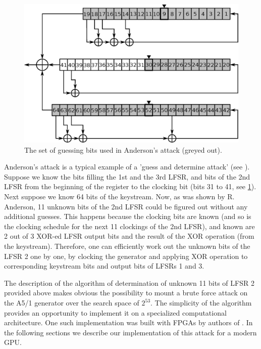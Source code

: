 \documentclass[runningheads,a4paper]{llncs}[2015/06/24]
\begin{document}
\begin{figure}
	\includegraphics[width=\linewidth]{./a51and.eps} 
	\caption{The set of guessing bits used in Anderson's attack (greyed out).}
	\label{fig:a51and}
\end{figure}


Anderson's attack is a typical example of a 'guess and determine attack' (see
\cite{BARD}). Suppose we know the bits filling the 1st and the 3rd LFSR, and
bits of the 2nd LFSR from the beginning of the register to the clocking bit
(bits 31 to 41, see \cref{fig:a51and}). Next suppose we know 64 bits of the
keystream. Now, as was shown by R. Anderson, 11 unknown bits of the 2nd LFSR
could be figured out without any additional guesses. This happens because the
clocking bits are known (and so is the clocking schedule for the next 11
clockings of the 2nd LFSR), and known are 2 out of 3 XOR-ed LFSR output bits
and the result of the XOR operation (from the keystream). Therefore, one can
efficiently work out the unknown bits of the LFSR 2 one by one, by clocking the
generator and applying XOR operation to corresponding keystream bits and output
bits of LFSRs 1 and 3.

The description of the algorithm of determination of unknown 11 bits of LFSR 2
provided above makes obvious the possibility to mount a brute force attack on
the A5/1 generator over the search space of $2^{53}$. The simplicity of the
algorithm provides an opportunity to implement it on a specialized
computational architecture. One such implementation was built with FPGAs by
authors of \cite{COPAC_1}. In the following sections we describe our
implementation of this attack for a modern GPU.


\end{document}
